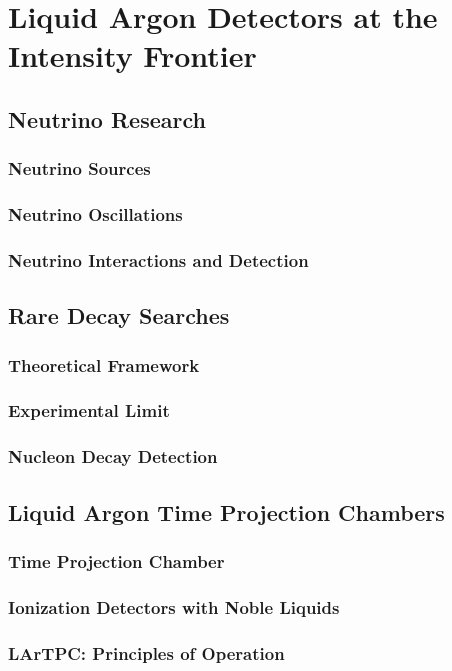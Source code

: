 \chapter{Liquid Argon Detectors at the Intensity Frontier}
\section{Neutrino Research}
\subsection{Neutrino Sources}
\subsection{Neutrino Oscillations}
\subsection{Neutrino Interactions and Detection}

\section{Rare Decay Searches}
\subsection{Theoretical Framework}
\subsection{Experimental Limit}
\subsection{Nucleon Decay Detection}

\section{Liquid Argon Time Projection Chambers}
\subsection{Time Projection Chamber}
\subsection{Ionization Detectors with Noble Liquids}
\subsection{LArTPC: Principles of Operation}
